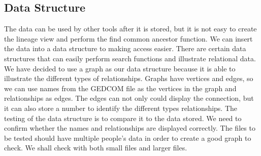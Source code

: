 \documentclass[onecolumn, draftclsnofoot, 10pt, compsoc]{IEEEtran}
\begin{document}
\subsection{Data Structure}
\begin{singlespace}
The data can be used by other tools after it is stored, but it is not easy to create the lineage view and perform the find common ancestor function. We can insert the data into a data structure to making access easier. There are certain data structures that can easily perform search functions and illustrate relational data. We have decided to use a graph as our data structure because it is able to illustrate the different types of relationships. Graphs have vertices and edges, so we can use names from the GEDCOM file as the vertices in the graph and relationships as edges. The edges can not only could display the connection, but it can also store a number to identify the different types relationships.  
\newline
\newline
The testing of the data structure is to compare it to the data stored. We need to confirm whether the names and relationships are displayed correctly. The files to be tested should have multiple people's data in order to create a good graph to check. We shall check with both small files and larger files.
\end{singlespace}
\end{document}
